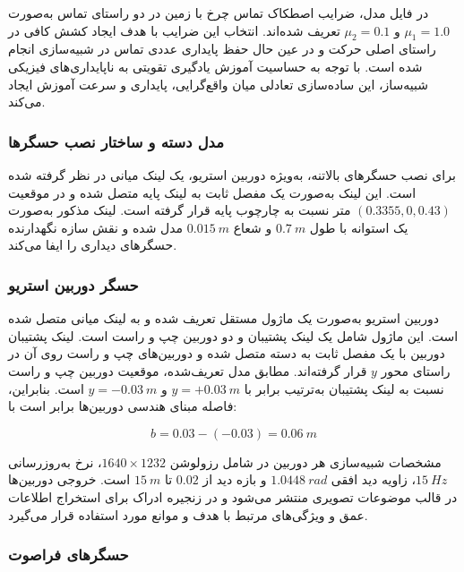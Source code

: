در فایل مدل، ضرایب اصطکاک تماس چرخ با زمین در دو راستای تماس به‌صورت \(\mu_1=1.0\) و \(\mu_2=0.1\) تعریف شده‌اند. انتخاب این ضرایب با هدف ایجاد کشش کافی در راستای اصلی حرکت و در عین حال حفظ پایداری عددی تماس در شبیه‌سازی انجام شده است. با توجه به حساسیت آموزش یادگیری تقویتی به ناپایداری‌های فیزیکی شبیه‌ساز، این ساده‌سازی تعادلی میان واقع‌گرایی، پایداری و سرعت آموزش ایجاد می‌کند.

\subsubsection{مدل دسته و ساختار نصب حسگرها}
\label{subsubsec:handle_sensor_mount}

برای نصب حسگرهای بالاتنه، به‌ویژه دوربین استریو، یک لینک میانی در نظر گرفته شده است. این لینک به‌صورت یک مفصل ثابت به لینک پایه متصل شده و در موقعیت \((0.3355,0,0.43)\) متر نسبت به چارچوب پایه قرار گرفته است. لینک مذکور به‌صورت یک استوانه با طول \(0.7~m\) و شعاع \(0.015~m\) مدل شده و نقش سازه نگهدارنده حسگرهای دیداری را ایفا می‌کند.

\subsubsection{حسگر دوربین استریو}
\label{subsubsec:stereo_camera_model}

دوربین استریو به‌صورت یک ماژول مستقل تعریف شده و به لینک میانی متصل شده است. این ماژول شامل یک لینک پشتیبان و دو دوربین چپ و راست است. لینک پشتیبان دوربین با یک مفصل ثابت به دسته متصل شده و دوربین‌های چپ و راست روی آن در راستای محور \(y\) قرار گرفته‌اند. مطابق مدل تعریف‌شده، موقعیت دوربین چپ و راست نسبت به لینک پشتیبان به‌ترتیب برابر با \(y=+0.03~m\) و \(y=-0.03~m\) است. بنابراین، فاصله مبنای هندسی دوربین‌ها برابر است با:

\begin{equation}
	b = 0.03 - (-0.03) = 0.06~m 
	\label{eq:stereo_camera_baseline}
\end{equation}

مشخصات شبیه‌سازی هر دوربین در  شامل رزولوشن \(1640\times1232\)، نرخ به‌روزرسانی \(15~Hz\)، زاویه دید افقی \(1.0448~rad\) و بازه دید از \(0.02\) تا \(15~m\) است. خروجی دوربین‌ها در قالب موضوعات تصویری منتشر می‌شود و در زنجیره ادراک برای استخراج اطلاعات عمق و ویژگی‌های مرتبط با هدف و موانع مورد استفاده قرار می‌گیرد.

\subsubsection{حسگرهای فراصوت }
\label{subsubsec:srf05_sensor_model}

